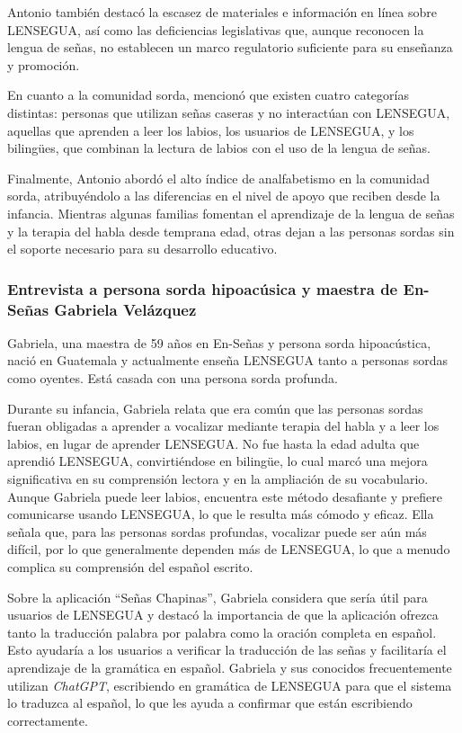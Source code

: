 Antonio también destacó la escasez de materiales e información en línea sobre LENSEGUA, así como las deficiencias legislativas que, aunque reconocen la lengua de señas, no establecen un marco regulatorio suficiente para su enseñanza y promoción.

En cuanto a la comunidad sorda, mencionó que existen cuatro categorías distintas: personas que utilizan señas caseras y no interactúan con LENSEGUA, aquellas que aprenden a leer los labios, los usuarios de LENSEGUA, y los bilingües, que combinan la lectura de labios con el uso de la lengua de señas.

Finalmente, Antonio abordó el alto índice de analfabetismo en la comunidad sorda, atribuyéndolo a las diferencias en el nivel de apoyo que reciben desde la infancia. Mientras algunas familias fomentan el aprendizaje de la lengua de señas y la terapia del habla desde temprana edad, otras dejan a las personas sordas sin el soporte necesario para su desarrollo educativo.

\subsubsection{Entrevista a persona sorda hipoacúsica y maestra de En-Señas Gabriela Velázquez}
Gabriela, una maestra de 59 años en En-Señas y persona sorda hipoacústica, nació en Guatemala y actualmente enseña LENSEGUA tanto a personas sordas como oyentes. Está casada con una persona sorda profunda. 

Durante su infancia, Gabriela relata que era común que las personas sordas fueran obligadas a aprender a vocalizar mediante terapia del habla y a leer los labios, en lugar de aprender LENSEGUA. No fue hasta la edad adulta que aprendió LENSEGUA, convirtiéndose en bilingüe, lo cual marcó una mejora significativa en su comprensión lectora y en la ampliación de su vocabulario. Aunque Gabriela puede leer labios, encuentra este método desafiante y prefiere comunicarse usando LENSEGUA, lo que le resulta más cómodo y eficaz. Ella señala que, para las personas sordas profundas, vocalizar puede ser aún más difícil, por lo que generalmente dependen más de LENSEGUA, lo que a menudo complica su comprensión del español escrito.

Sobre la aplicación ``Señas Chapinas'', Gabriela considera que sería útil para usuarios de LENSEGUA y destacó la importancia de que la aplicación ofrezca tanto la traducción palabra por palabra como la oración completa en español. Esto ayudaría a los usuarios a verificar la traducción de las señas y facilitaría el aprendizaje de la gramática en español. Gabriela y sus conocidos frecuentemente utilizan \textit{ChatGPT}, escribiendo en gramática de LENSEGUA para que el sistema lo traduzca al español, lo que les ayuda a confirmar que están escribiendo correctamente.

